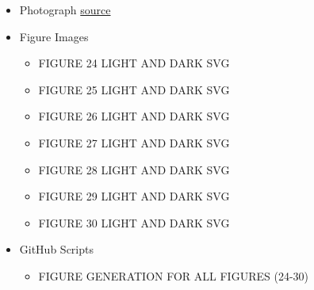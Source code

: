 \documentclass{article}
\begin{document}
\begin{itemize}
    \item Photograph \href{https://pixabay.com/photos/flower-field-flowers-field-trees-250016/}{source}
    \item Figure Images
    \begin{itemize}
        \item FIGURE 24 LIGHT AND DARK SVG
        \item FIGURE 25 LIGHT AND DARK SVG
        \item FIGURE 26 LIGHT AND DARK SVG
        \item FIGURE 27 LIGHT AND DARK SVG
        \item FIGURE 28 LIGHT AND DARK SVG
        \item FIGURE 29 LIGHT AND DARK SVG
        \item FIGURE 30 LIGHT AND DARK SVG
    \end{itemize}
    \item GitHub Scripts
    \begin{itemize}
        \item FIGURE GENERATION FOR ALL FIGURES (24-30)
    \end{itemize}
\end{itemize}

\fi


\printbibliography
\end{document}
